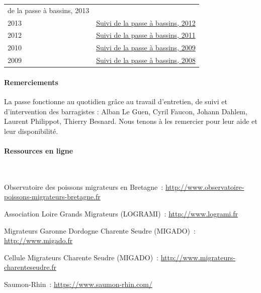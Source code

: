 \documentclass[11pt,twocolumn,titlepage,twoside]{article}\usepackage[]{graphicx}\usepackage[]{color}
\begin{document}
\begin{table}[htbp]
\begin{tabular}{lp{7cm}}
{de la passe à bassins, 2013}\\
2013 &
\href{https://eptbvilaine56.sharepoint.com/:b:/g/extranet/Ed6J-KFKTc1EhcXyxox1eU4B86i9IYhY53FuP2ilW9TdhA?e=pagXSD}{Suivi
de la passe à bassins, 2012}\\
2012 &
\href{https://eptbvilaine56.sharepoint.com/:b:/g/extranet/EWQJkGynJO9FkLtMc0evglwBhVC3k2ORqwqhA_ez-fecKQ?e=xaK6zo}{Suivi
de la passe à bassins, 2011}\\
2010 &
\href{https://eptbvilaine56.sharepoint.com/:b:/g/extranet/ETTqqTILtm5OjioHyGGAsooBsGVP5CgR9fE-xCj-evifLA?e=2I4CbN}{Suivi
de la passe à bassins, 2009}\\
2009 &
\href{https://eptbvilaine56.sharepoint.com/:b:/g/extranet/ESOYjucqRlRNm4hXNuO3-EgBBOTq0zMqmhq0u125J21Yxw?e=EbCzao}{Suivi
de la passe à bassins, 2008}\\
%
\bottomrule
\end{tabular}
\label{table_references}
\end{table}

\bigskip
\paragraph{Remerciements}

La passe fonctionne au quotidien grâce au travail d'entretien, de suivi et
d'intervention des barragistes : Alban Le Guen, Cyril Faucon, Johann Dahlem,
Laurent Philippot, Thierry Besnard. Nous tenons à les remercier pour leur aide
et leur disponibilité.
\bigskip

\vfill
\paragraph{Ressources en ligne} ~

Observatoire des poissons migrateurs en Bretagne~:
\href{http://www.observatoire-poissons-migrateurs-bretagne.fr}{{http://www.observatoire-poissons-migrateurs-bretagne.fr}}

Association Loire Grands Migrateurs (LOGRAMI)~:
\href{http://www.logrami.fr}{{http://www.logrami.fr}}

Migrateurs Garonne Dordogne Charente Seudre (MIGADO)~:
\href{http://www.migado.fr}{{http://www.migado.fr}}

Cellule Migrateurs Charente Seudre (MIGADO)~:
\href{http://www.migrateurs-charenteseudre.fr}{{http://www.migrateurs-charenteseudre.fr}}

Saumon-Rhin~:   
\href{https://www.saumon-rhin.com/}{{https://www.saumon-rhin.com/}}
\end{document}

